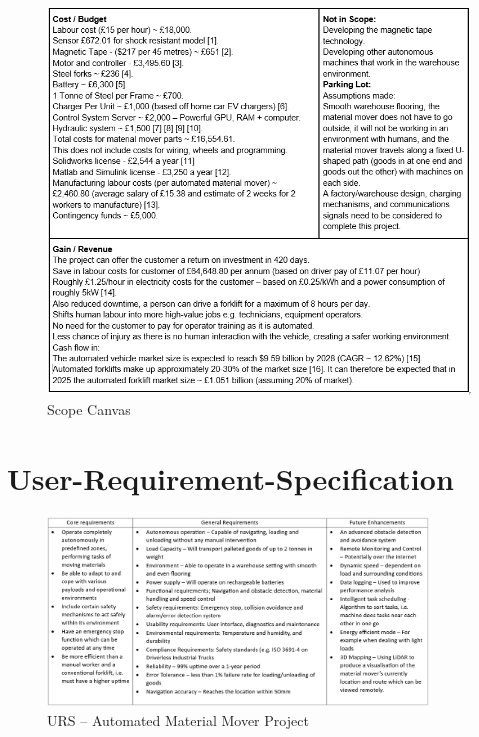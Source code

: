 \documentclass[12pt]{article}
\begin{document}
\begin{figure}[H]
    \centering
        \includegraphics[width=0.9\linewidth]{scope 3 + 4.png}
        \caption{Scope Canvas}
    \label{fig:enter-label}
\end{figure}

\section{User-Requirement-Specification}
\begin{figure}[htbp]
    \centering
    \includegraphics[width=0.9\textwidth]{URS1.png}
    \caption{URS – Automated Material Mover Project}
    \label{fig:URS}
\end{figure}

\FloatBarrier




\end{document}
